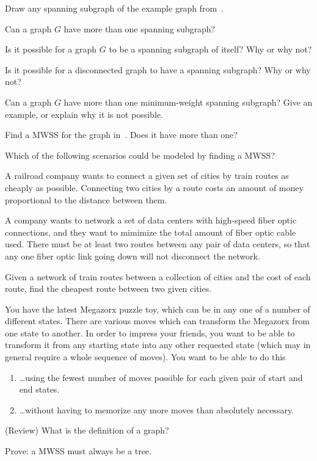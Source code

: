 \documentclass{tufte-handout}
\begin{document}
\begin{questions}
\item \label{q:draw-ss} Draw any spanning subgraph of the example
  graph from~.
\item Can a graph $G$ have more than one spanning subgraph?
\item Is it possible for a graph $G$ to be a spanning subgraph of
  itself?  Why or why not?
\item Is it possible for a disconnected graph to have a spanning
  subgraph?  Why or why not?
\item Can a graph $G$ have more than one minimum-weight spanning
  subgraph?  Give an example, or explain why it is not possible.
\item Find a MWSS for the graph in~. Does it have
  more than one?
\item \label{q:scenarios} Which of the following scenarios could be
  modeled by finding a MWSS?
  \begin{subquestions}
  \item A railroad company wants to connect a given set of cities by
    train routes as cheaply as possible. Connecting two cities by a
    route costs an amount of money proportional to the distance
    between them.
  \item A company wants to network a set of data centers with
    high-speed fiber optic connections, and they want to mimimize the
    total amount of fiber optic cable used. There must be at least two
    routes between any pair of data centers, so that any one fiber
    optic link going down will not disconnect the network.
  \item Given a network of train routes between a collection of
    cities and the cost of each route, find the cheapest route between
    two given cities.
  \item You have the latest Megazorx puzzle toy, which can be in any
    one of a number of different states.  There are various moves
    which can transform the Megazorx from one state to another.  In
    order to impress your friends, you want to be able to transform it
    from any starting state into any other requested state (which may
    in general require a whole sequence of moves). You want to be able
    to do this
    \begin{enumerate}[label=(\roman*)]
    \item \dots using the fewest number of moves possible for each
      given pair of start and end states.
    \item \dots without having to memorize any more moves than
      absolutely necessary.
    \end{enumerate}
  \end{subquestions}

\item (Review) What is the definition of a  graph?
\item \label{q:mwss-tree} Prove: a MWSS must always be a tree. 
\end{questions}
\end{document}
